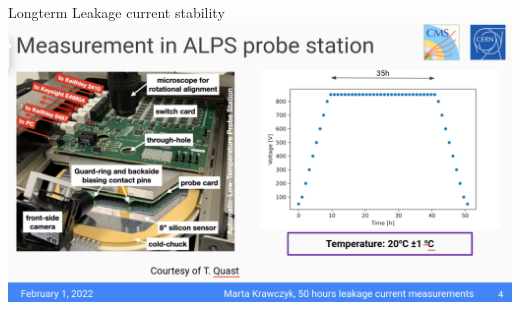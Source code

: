 \documentclass{beamer}
\begin{document}
\begin{frame}{Longterm Leakage current stability}
  \includegraphics[width=.7\textwidth]{plots/Longterm_process.png}
\end{frame}




%
%
%
%
%
\end{document}

